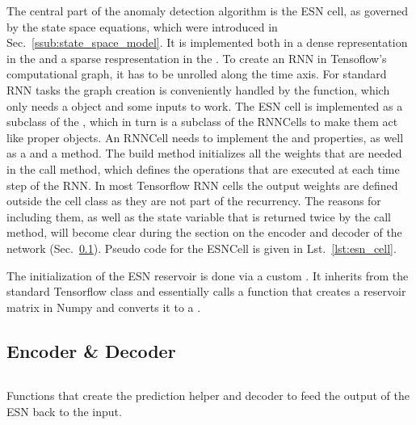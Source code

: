 The central part of the anomaly detection algorithm is the ESN cell, as
governed by the state space equations, which were introduced in
Sec.~\ref{ssub:state_space_model}. It is implemented both in a dense
representation in the  and a sparse respresentation in the
.  To create an RNN in Tensoflow's computational graph, it
has to be unrolled along the time axis. For standard RNN tasks the graph
creation is conveniently handled by the  function,
which only needs a  object and some inputs to
work.  The ESN cell is implemented as a subclass of the
, which in turn is a subclass of the RNNCells
to make them act like proper  objects.  An RNNCell needs to
implement the  and  properties, as well as a
 and a  method.  The build method initializes all the
weights that are needed in the call method, which defines the operations that are
executed at each time step of the RNN.  In most Tensorflow RNN cells the output
weights are defined outside the cell class as they are not part of the
recurrency. The reasons for including them, as well as the state variable that
is returned twice by the call method, will become clear during the section on
the encoder and decoder of the network (Sec.~\ref{sec:encoder_decoder}).
Pseudo code for the ESNCell is given in Lst.~\ref{lst:esn_cell}.

The initialization of the ESN reservoir is done via a custom
.  It inherits from the standard Tensorflow
 class and essentially calls a function that creates a
reservoir matrix in Numpy and converts it to a .


\subsection{Encoder \& Decoder}%
\label{sec:encoder_decoder}

\begin{listing}[t]
  \inputminted{py}{pseudocode/build_model.py}
  \caption{Functions that create the prediction helper and decoder to feed the
  output of the ESN back to the input.}
  \label{lst:decoder}
\end{listing}

